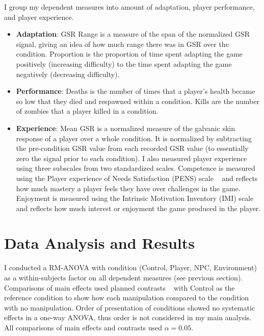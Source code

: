 I group my dependent measures into amount of adaptation, player performance, and player experience.

\begin{itemize}
	\item \textbf{Adaptation}: GSR Range is a measure of the span of the normalized GSR signal, giving an idea of how much range there was in GSR over the condition. Proportion is the proportion of time spent adapting the game positively (increasing difficulty) to the time spent adapting the game negatively (decreasing difficulty).

	\item \textbf{Performance}: Deaths is the number of times that a player's health became so low that they died and respawned within a condition. Kills are the number of zombies that a player killed in a condition.

	\item \textbf{Experience}: Mean GSR is a normalized measure of the galvanic skin response of a player over a whole condition. It is normalized by subtracting the pre-condition GSR value from each recorded GSR value (to essentially zero the signal prior to each condition). I also measured player experience using three subscales from two standardized scales. Competence is measured using the Player experience of Needs Satisfaction (PENS) scale ~\cite{ryan2006motivational} and reflects how much mastery a player feels they have over challenges in the game. Enjoyment is measured using the Intrinsic Motivation Inventory (IMI) scale ~\cite{ryan1982control} and reflects how much interest or enjoyment the game produced in the player.
\end{itemize}


\section{Data Analysis and Results}

I conducted a RM-ANOVA with condition (Control, Player, NPC, Environment) as a within-subjects factor on all dependent measures (see previous section). Comparisons of main effects used planned contrasts ~\cite{field2013discovering} with Control as the reference condition to show how each manipulation compared to the condition with no manipulation. Order of presentation of conditions showed no systematic effects in a one-way ANOVA, thus order is not considered in my main analysis. All comparisons of main effects and contrasts used $\alpha = 0.05$.

